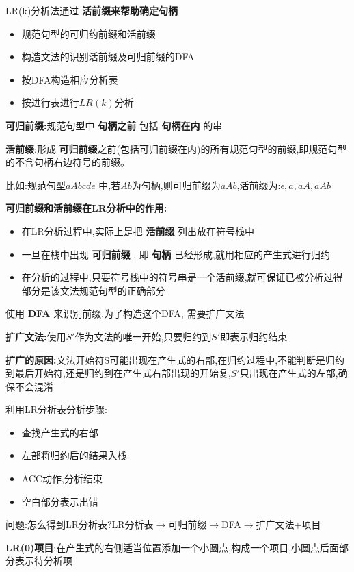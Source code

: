 \documentclass[UTF8,a4paper]{ctexart}
\newcommand{\spaceline}{\vspace{\baselineskip}}
\begin{document}
 LR(k)分析法通过 \textbf{活前缀来帮助确定句柄}
 \begin{itemize}
  \item 规范句型的可归约前缀和活前缀
  \item 构造文法的识别活前缀及可归前缀的DFA
  \item 按DFA构造相应分析表
  \item 按进行表进行$LR(k)$分析
 \end{itemize}

 \textbf{可归前缀:}规范句型中 \textbf{句柄之前} 包括 \textbf{句柄在内} 的串

 \textbf{活前缀}:形成 \textbf{可归前缀}之前(包括可归前缀在内)的所有规范句型的前缀,即规范句型的不含句柄右边符号的前缀。

 比如:规范句型$aAbcde$ 中,若$Ab$为句柄,则可归前缀为$aAb$,活前缀为:$\epsilon , a , aA , aAb$

 \textbf{可归前缀和活前缀在LR分析中的作用:}
 \begin{itemize}
  \item 在LR分析过程中,实际上是把 \textbf{活前缀} 列出放在符号栈中
  \item 一旦在栈中出现 \textbf{可归前缀} , 即 \textbf{句柄} 已经形成,就用相应的产生式进行归约
  \item 在分析的过程中,只要符号栈中的符号串是一个活前缀,就可保证已被分析过得部分是该文法规范句型的正确部分
 \end{itemize}

 使用 \textbf{DFA} 来识别前缀,为了构造这个DFA, 需要扩广文法

 \textbf{扩广文法:}使用$S'$作为文法的唯一开始,只要归约到$S'$即表示归约结束

 \textbf{扩广的原因:}文法开始符S可能出现在产生式的右部,在归约过程中,不能判断是归约到最后开始符,还是归约到在产生式右部出现的开始复,$S'$只出现在产生式的左部,确保不会混淆

 利用LR分析表分析步骤:
 \begin{itemize}
  \item 查找产生式的右部
  \item 左部将归约后的结果入栈
  \item ACC动作,分析结束
  \item 空白部分表示出错
 \end{itemize}

 问题:怎么得到LR分析表?LR分析表$\to$可归前缀$\to$DFA$\to$扩广文法+项目

 \spaceline
 \textbf{LR(0)项目}:在产生式的右侧适当位置添加一个小圆点,构成一个项目,小圆点后面部分表示待分析项
\end{document}
